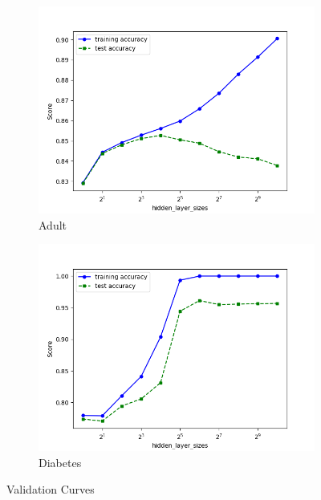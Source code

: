 \documentclass[11pt, twocolumn]{article}
\begin{document}
    \begin{figure}[!htbp]
        \begin{subfigure}{.24\textwidth}
            \centering
            \includegraphics[width=.9\textwidth]{validations_Adult_MLP_hidden_layer_sizes_1_layer}
            \caption{Adult}
            \label{fig:validations_Adult_MLP_hidden_layer_sizes_1_layer}
        \end{subfigure}
        \begin{subfigure}{.24\textwidth}
            \centering
            \includegraphics[width=.9\textwidth]{validations_Diabetes_MLP_hidden_layer_sizes_1_layer}
            \caption{Diabetes}
            \label{fig:validations_Diabetes_MLP_hidden_layer_sizes_1_layer}
        \end{subfigure}
        \caption{Validation Curves}
    \end{figure}
    \FloatBarrier
\end{document}
